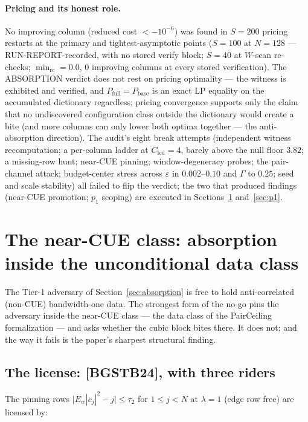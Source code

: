 \documentclass[11pt]{article}
\theoremstyle{plain}
\theoremstyle{definition}
\theoremstyle{remark}
\newcommand{\Cled}{C_{\mathrm{led}}}
\begin{document}
\paragraph{Pricing and its honest role.}
No improving column (reduced cost $< -10^{-6}$) was found in $S = 200$ pricing
restarts at the primary and tightest-asymptotic points ($S = 100$ at $N = 128$ ---
RUN-REPORT-recorded, with no stored verify block; $S = 40$ at $W$-scan
re-checks; $\min_{\mathrm{rc}} = 0.0$, $0$ improving columns at every stored
verification). The ABSORPTION verdict does not rest on pricing optimality --- the
witness is exhibited and verified, and
$P_{\mathrm{full}} = P_{\mathrm{base}}$ is an exact LP equality on the
accumulated dictionary regardless; pricing convergence supports only the claim
that no undiscovered configuration class outside the dictionary would create a
bite (and more columns can only lower both optima together --- the
anti-absorption direction). The audit's eight break attempts (independent witness
recomputation; a per-column ladder at $\Cled = 4$, barely above the null floor
$3.82$; a missing-row hunt; near-CUE pinning; window-degeneracy probes; the
pair-channel attack; budget-center stress across $\varepsilon$ in
$0.002$--$0.10$ and $\Gamma$ to $0.25$; seed and scale stability) all failed to
flip the verdict; the two that produced findings (near-CUE promotion; $p_1$
scoping) are executed in Sections~\ref{sec:nearcue} and~\ref{sec:p1}.

\section{The near-CUE class: absorption inside the unconditional data class}
\label{sec:nearcue}

The Tier-1 adversary of Section~\ref{sec:absorption} is free to hold
anti-correlated (non-CUE) bandwidth-one data. The strongest form of the no-go
pins the adversary inside the near-CUE class --- the data class of the
PairCeiling formalization --- and asks whether the cubic block bites there. It
does not; and the way it fails is the paper's sharpest structural finding.

\subsection{The license: [BGSTB24], with three riders}
\label{sec:license}

The pinning rows $\bigl| E_w |c_j|^2 - j \bigr| \le \tau_2$ for
$1 \le j < N$ at $\lambda = 1$ (edge row free) are licensed by:
\end{document}
